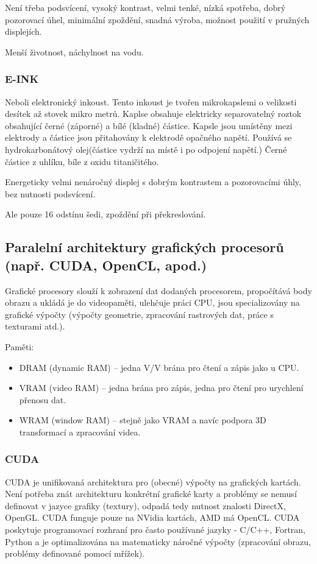 Není třeba podsvícení, vysoký kontrast, velmi tenké, nízká spotřeba, dobrý pozorovací úhel, minimální zpoždění, snadná výroba, možnost použití v pružných displejích.

Menší životnost, náchylnost na vodu.

\subsubsection{E-INK}
Neboli elektronický inkoust. Tento inkoust je tvořen mikrokapslemi o velikosti desítek až stovek mikro metrů. Kaplse obsahuje elektricky separovatelný roztok obsahující černé (záporné) a bílé (kladné) částice. Kapsle jsou umístěny mezi elektrody a částice jsou přitahovány k elektrodě opačného napětí. Používá se hydrokarbonátový olej(částice vydrží na místě i po odpojení napětí.) Černé částice z uhlíku, bíle z oxidu titaničitého.

Energeticky velmi nenáročný displej s dobrým kontrastem a pozorovacími úhly, bez nutnosti podsvícení. 

Ale pouze 16 odstínu šedi, zpoždění při překreslování.

\subsection{Paralelní architektury grafických procesorů (např. CUDA, OpenCL, apod.)}
Grafické procesory slouží k zobrazení dat dodaných procesorem, propočítává body obrazu a ukládá je do videopaměti, ulehčuje práci CPU, jsou specializovány na grafické výpočty (výpočty geometrie, zpracování rastrových dat, práce s texturami atd.).

Paměti:
\begin{itemize}
\item DRAM (dynamic RAM) -- jedna V/V brána pro čtení a zápis jako u CPU.
\item VRAM (video RAM) -- jedna brána pro zápis, jedna pro čtení pro urychlení přenosu dat.
\item WRAM (window RAM) -- stejně jako VRAM a navíc podpora 3D transformací a zpracování videa.
\end{itemize}

\subsubsection{CUDA}
CUDA je unifikovaná architektura pro (obecné) výpočty na grafických kartách. Není potřeba znát architekturu konkrétní grafické karty a problémy se nemusí definovat v jazyce grafiky (textury), odpadá  tedy nutnost znalosti DirectX, OpenGL. CUDA funguje pouze na NVidia kartách, AMD má OpenCL.
CUDA poskytuje programovací rozhraní pro často používané jazyky - C/C++, Fortran, Python a je optimalizována na matematicky náročné výpočty (zpracování obrazu, problémy definované pomocí mřížek). 

